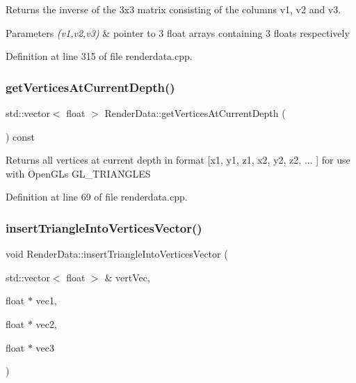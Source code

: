 \begin{DoxyReturn}{Returns}
the inverse of the 3x3 matrix consisting of the columns v1, v2 and v3. 
\end{DoxyReturn}

\begin{DoxyParams}{Parameters}
{\em (v1,v2,v3)} & pointer to 3 float arrays containing 3 floats respectively \\
\hline
\end{DoxyParams}


Definition at line 315 of file renderdata.\+cpp.

\mbox{\label{class_render_data_a2aff56e1742b853bcae6f251e258085e}} 
\subsubsection{\texorpdfstring{get\+Vertices\+At\+Current\+Depth()}{getVerticesAtCurrentDepth()}}
{\footnotesize\ttfamily std\+::vector$<$ float $>$ Render\+Data\+::get\+Vertices\+At\+Current\+Depth (\begin{DoxyParamCaption}{ }\end{DoxyParamCaption}) const}

\begin{DoxyReturn}{Returns}
all vertices at current depth in format \mbox{[}x1, y1, z1, x2, y2, z2, ... \mbox{]} for use with Open\+GL\textquotesingle{}s G\+L\+\_\+\+T\+R\+I\+A\+N\+G\+L\+ES 
\end{DoxyReturn}


Definition at line 69 of file renderdata.\+cpp.

\mbox{\label{class_render_data_a4fca77ce81a628de0ddaeb7d75a4c371}} 
\subsubsection{\texorpdfstring{insert\+Triangle\+Into\+Vertices\+Vector()}{insertTriangleIntoVerticesVector()}}
{\footnotesize\ttfamily void Render\+Data\+::insert\+Triangle\+Into\+Vertices\+Vector (\begin{DoxyParamCaption}\item[{std\+::vector$<$ float $>$ \&}]{vert\+Vec,  }\item[{float $\ast$}]{vec1,  }\item[{float $\ast$}]{vec2,  }\item[{float $\ast$}]{vec3 }\end{DoxyParamCaption})\hspace{0.3cm}{\ttfamily [private]}}

